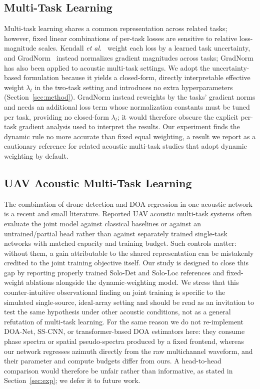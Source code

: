 \documentclass[5p,twocolumn]{elsarticle}
\begin{document}
\subsection{Multi-Task Learning}
Multi-task learning shares a common representation across related tasks; however, fixed linear combinations of per-task losses are sensitive to relative loss-magnitude scales. Kendall \emph{et al.}~\cite{kendall2018mtl} weight each loss by a learned task uncertainty, and GradNorm~\cite{chen2018gradnorm} instead normalizes gradient magnitudes across tasks; GradNorm has also been applied to acoustic multi-task settings. We adopt the uncertainty-based formulation because it yields a closed-form, directly interpretable effective weight $\lambda_t$ in the two-task setting and introduces no extra hyperparameters (Section~\ref{sec:method}). GradNorm instead reweights by the tasks' gradient norms and needs an additional loss term whose normalization constants must be tuned per task, providing no closed-form $\lambda_t$; it would therefore obscure the explicit per-task gradient analysis used to interpret the results. Our experiment finds the dynamic rule no more accurate than fixed equal weighting, a result we report as a cautionary reference for related acoustic multi-task studies that adopt dynamic weighting by default.

\subsection{UAV Acoustic Multi-Task Learning}
The combination of drone detection and DOA regression in one acoustic network is a recent and small literature. Reported UAV acoustic multi-task systems often evaluate the joint model against classical baselines or against an untrained/partial head rather than against separately trained single-task networks with matched capacity and training budget. Such controls matter: without them, a gain attributable to the shared representation can be mistakenly credited to the joint training objective itself. Our study is designed to close this gap by reporting properly trained Solo-Det and Solo-Loc references and fixed-weight ablations alongside the dynamic-weighting model. We stress that this counter-intuitive observational finding on joint training is specific to the simulated single-source, ideal-array setting and should be read as an invitation to test the same hypothesis under other acoustic conditions, not as a general refutation of multi-task learning. For the same reason we do not re-implement DOA-Net, SS-CNN, or transformer-based DOA estimators here: they consume phase spectra or spatial pseudo-spectra produced by a fixed frontend, whereas our network regresses azimuth directly from the raw multichannel waveform, and their parameter and compute budgets differ from ours. A head-to-head comparison would therefore be unfair rather than informative, as stated in Section~\ref{sec:exp}; we defer it to future work.
\end{document}
